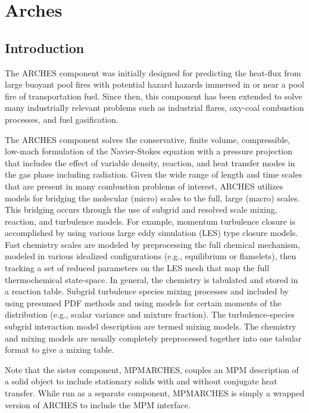 
\chapter{Arches}

\section{Introduction}
%
The ARCHES component was initially designed for predicting the heat-flux from large buoyant pool fires with potential hazard hazards immersed in or near a pool fire of transportation fuel.  Since then, this component has been extended to solve many industrially relevant problems such as industrial flares, oxy-coal combustion processes, and fuel gasification.  

The ARCHES component solves the conservative, finite volume, compressible, low-mach formulation of the Navier-Stokes equation with a pressure projection that includes the effect of variable density, reaction, and heat transfer modes in the gas phase including radiation.  Given the wide range of length and time scales that are present in many combustion problems of interest, ARCHES utilizes models for bridging the molecular (micro) scales to the full, large (macro) scales.  This bridging occurs through the use of subgrid and resolved scale mixing, reaction, and turbulence models. For example, momentum turbulence closure is accomplished by using various large eddy simulation (LES) type closure models. Fast chemistry scales are modeled by preprocessing the full chemical mechanism, modeled in various idealized configurations (e.g., equilibrium or flamelets), then tracking a set of reduced parameters on the LES mesh that map the full thermochemical state-space.  In general, the chemistry is tabulated and stored in a reaction table.  Subgrid turbulence species mixing processes and included by using presumed PDF methods and using models for certain moments of the distribution (e.g., scalar variance and mixture fraction).  The turbulence-species subgrid interaction model description are termed mixing models.  The chemistry and mixing models are usually completely preprocessed together into one tabular format to give a mixing table.  

Note that the sister component, MPMARCHES, couples an MPM description of a solid object to include stationary solids with and without conjugate heat transfer. While run as a separate component, MPMARCHES is simply a wrapped version of ARCHES to include the MPM interface.  

